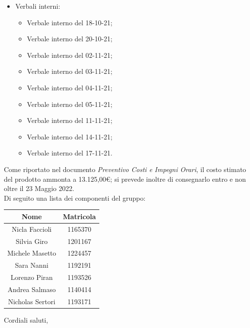 \documentclass[11pt]{letter}
\begin{document}
\begin{letter}{}
\begin{itemize}
\begin{itemize}
			\end{itemize}
			\item Verbali interni:
			\begin{itemize}
				\item Verbale interno del 18-10-21;
				\item Verbale interno del 20-10-21;
				\item Verbale interno del 02-11-21;
				\item Verbale interno del 03-11-21;
				\item Verbale interno del 04-11-21;
				\item Verbale interno del 05-11-21;
				\item Verbale interno del 11-11-21;
				\item Verbale interno del 14-11-21;
				\item Verbale interno del 17-11-21.
			\end{itemize}
		\end{itemize}
		Come riportato nel documento \textit{Preventivo Costi e Impegni Orari}, il costo stimato del prodotto ammonta a 13.125,00\euro;
		si prevede inoltre di consegnarlo entro e non oltre il 23 Maggio 2022. \\
		Di seguito una lista dei componenti del gruppo: \\
		\begin{center}
			\begin{tabular}{ c | c }
				\textbf{Nome} & \textbf{Matricola} \\
				\hline Nicla Faccioli & 1165370 \\
				Silvia Giro & 1201167 \\
				Michele Masetto & 1224457 \\
				Sara Nanni & 1192191 \\
				Lorenzo Piran & 1193526 \\
				Andrea Salmaso & 1140414 \\
				Nicholas Sertori & 1193171 \\		
			\end{tabular}
		\end{center}
		\closing{Cordiali saluti,}
	\end{letter}
\end{document}
